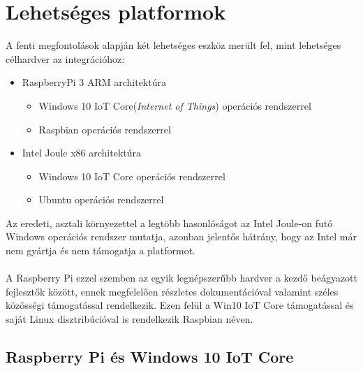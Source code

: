 \section{Lehetséges platformok}

A fenti megfontolások alapján két lehetséges eszköz merült fel, mint lehetséges célhardver az integrációhoz:
\begin{itemize}
\item RaspberryPi 3 ARM architektúra
\begin{itemize}
\item Windows 10 IoT Core(\emph{Internet of Things}) operációs rendszerrel
\item Raspbian operációs rendszerrel
\end{itemize}
\item Intel Joule x86 architektúra
\begin{itemize}
\item Windows 10 IoT Core operációs rendszerrel
\item Ubuntu operációs rendszerrel 
\end{itemize}
\end{itemize}

Az eredeti, asztali környezettel a legtöbb hasonlóságot az Intel Joule-on futó Windows operációs rendszer mutatja, azonban jelentős hátrány, hogy az Intel már nem gyártja és nem támogatja a platformot.\\
\\
A Raspberry Pi ezzel szemben az egyik legnépszerűbb hardver a kezdő beágyazott fejlesztők között, ennek megfelelően részletes dokumentációval valamint széles közösségi támogatással rendelkezik. Ezen felül a Win10 IoT Core támogatással és saját Linux disztribúcióval is rendelkezik Raspbian néven.

\subsection{Raspberry Pi és Windows 10 IoT Core} \label{rpi-win10iot}

